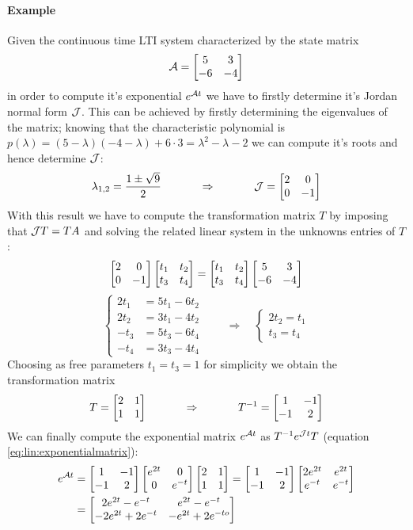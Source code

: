 		\paragraph{Example} Given the continuous time LTI system characterized by the state matrix
		\[ \mathcal{A}= \begin{bmatrix}  5 & 3 \\ -6 & -4 \end{bmatrix} \]
		in order to compute it's exponential $e^{\mathcal{A} t}$ we have to firstly determine it's Jordan normal form $\mathcal{J}$. This can be achieved by firstly determining the eigenvalues of the matrix; knowing that the characteristic polynomial is $p(\lambda) = (5 - \lambda)(-4-\lambda) + 6\cdot 3 = \lambda^2 - \lambda - 2$ we can compute it's roots and hence determine $\mathcal{J}$:
		\[ \lambda_{1,2} = \frac{1\pm \sqrt 9}{2} \hspace{1.2cm} \Rightarrow \hspace{1.2cm} \mathcal{J}= \begin{bmatrix}  2 & 0 \\ 0 & -1 \end{bmatrix} \]
		With this result we have to compute the transformation matrix $T$ by imposing that $\mathcal{J} T = T A$ and solving the related linear system in the unknowns entries of $T$:
		\[ \begin{bmatrix}  2 & 0 \\ 0 & -1 \end{bmatrix} \begin{bmatrix} t_1 & t_2 \\ t_3 & t_4 \end{bmatrix} = \begin{bmatrix} t_1 & t_2 \\ t_3 & t_4 \end{bmatrix} \begin{bmatrix}  5 & 3 \\ -6 & -4 \end{bmatrix} \]
		\[ \begin{cases}
			2 t_1 & = 5 t_1 - 6t_2 \\
			2 t_2 & = 3 t_1 - 4 t_2 \\
			-t_3 & = 5 t_3 - 6 t_4 \\
			-t_4 & = 3t_3 - 4 t_4
		\end{cases} \qquad \Rightarrow \quad \begin{cases}
			2t_2 = t_1 \\
			t_3 = t_4
		\end{cases} \]
		Choosing as free parameters $t_1 = t_3 = 1$ for simplicity we obtain the transformation matrix
		\[ T = \begin{bmatrix} 2 & 1 \\ 1 & 1 \end{bmatrix} \hspace{1.2cm} \Rightarrow \hspace{1.2cm} T^{-1} = \begin{bmatrix}   1 & - 1 \\ - 1 & 2 \end{bmatrix} \]
		We can finally compute the exponential matrix $e^{\mathcal{A} t}$ as $T^{-1} e^{\mathcal{J} t} T$ (equation \ref{eq:lin:exponentialmatrix}):
		\begin{align*}
			e^{\mathcal{A} t} & = \begin{bmatrix}   1 & - 1 \\ - 1 & 2 \end{bmatrix} \begin{bmatrix} e^{2t} & 0 \\ 0 & e^{-t}  \end{bmatrix} \begin{bmatrix} 2 & 1 \\ 1 & 1 \end{bmatrix} = \begin{bmatrix}   1 & - 1 \\ - 1 & 2 \end{bmatrix}  \begin{bmatrix}  2 e^{2t} & e^{2t} \\ e^{-t} & e^{-t}  \end{bmatrix} \\
			& = \begin{bmatrix} 2 e^{2t} -e^{-t} & e^{2t} - e^{-t} \\ -2 e^{2t} + 2 e^{-t} & -e^{2t} + 2 e^{-to}  \end{bmatrix}
		\end{align*}
		
